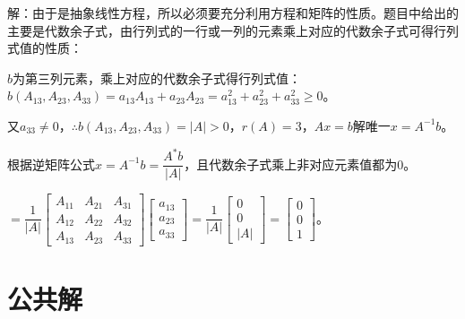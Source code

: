 \documentclass[UTF8, 12pt]{ctexart}
\begin{document}
解：由于是抽象线性方程，所以必须要充分利用方程和矩阵的性质。题目中给出的主要是代数余子式，由行列式的一行或一列的元素乘上对应的代数余子式可得行列式值的性质：

$b$为第三列元素，乘上对应的代数余子式得行列式值：$b(A_{13},A_{23},A_{33})=a_{13}A_{13}+a_{23}A_{23}=a_{13}^2+a_{23}^2+a_{33}^2\geqslant0$。

又$a_{33}\neq0$，$\therefore b(A_{13},A_{23},A_{33})=\vert A\vert>0$，$r(A)=3$，$Ax=b$解唯一$x=A^{-1}b$。

根据逆矩阵公式$x=A^{-1}b=\dfrac{A^*b}{\vert A\vert}$，且代数余子式乘上非对应元素值都为0。

$=\dfrac{1}{\vert A\vert}\left[\begin{array}{ccc}
    A_{11} & A_{21} & A_{31} \\
    A_{12} & A_{22} & A_{32} \\
    A_{13} & A_{23} & A_{33} 
\end{array}\right]\left[\begin{array}{c}
    a_{13} \\
    a_{23} \\
    a_{33}
\end{array}\right]=\dfrac{1}{\vert A\vert}\left[\begin{array}{c}
    0 \\
    0 \\
    \vert A\vert
\end{array}\right]=\left[\begin{array}{c}
    0 \\
    0 \\
    1
\end{array}\right]$。

\section{公共解}
\end{document}
